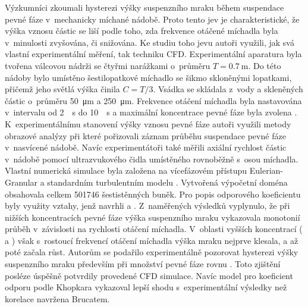 Výzkumníci \citet{sar10} zkoumali hysterezi výšky suspenzního mraku během suspendace pevné fáze v~mechanicky míchané nádobě. 
Proto tento jev je charakteristické, že výška vznosu částic se liší podle toho, zda frekvence otáčené míchadla byla v~minulosti zvyšována, či snižována. Ke studiu toho jevu autoři využili, jak svá vlastní experimentální měření, tak techniku CFD. Experimentální aparatura byla tvořena válcovou nádrži se čtyřmi narážkami o~průměru $T=\SI{0.7}{\meter}$. Do této nádoby bylo umístěno šestilopatkové míchadlo se šikmo skloněnými lopatkami, přičemž jeho světlá výška činila $C=T/3$. Vsádka se skládala z~vody a skleněných částic o~průměru \SI{50}{\micro\meter} a \SI{250}{\micro\meter}. Frekvence otáčení míchadla byla nastavována v~intervalu od \SI{2}{\per\second} do \SI{10}{\per\second} a maximální koncentrace pevné fáze byla zvolena . K~experimentálnímu stanovení výšky vznosu pevné fáze autoři využili metody obrazové analýzy při které pořizovali záznam průběhu suspendace pevné fáze v~nasvícené nádobě. Navíc experimentátoři také měřili axiální rychlost částic v~nádobě pomocí ultrazvukového čidla umístěného rovnoběžně s~osou míchadla. Vlastní numerická simulace byla založena na vícefázovém přístupu Eulerian-Granular a standardním turbulentním modelu \keps{}. Vytvořená výpočetní doména obsahovala celkem \num{501746} šestistěnných buněk. Pro popis odporového koeficientu byly využity vztahy, jenž navrhli \citet{bru98} a \citet{kho06}. Z~naměřených výsledků vyplynulo, že při nižších koncentracích pevné fáze výška suspenzního mraku vykazovala monotonií průběh v~závislosti na rychlosti otáčení míchadla. V~oblasti vyšších koncentrací ( a ) však s~rostoucí frekvencí otáčení míchadla výška mraku nejprve klesala, a až poté začala růst. Autorům se podařilo experimentálně pozorovat hysterezi výšky suspenzního mraku především při množství pevné fáze rovnu . Toto zjištění posléze úspěšně potvrdily provedené CFD simulace. Navíc model pro koeficient odporu podle Khopkara vykazoval lepší shodu s~experimentální výsledky než korelace navržena Brucatem.


